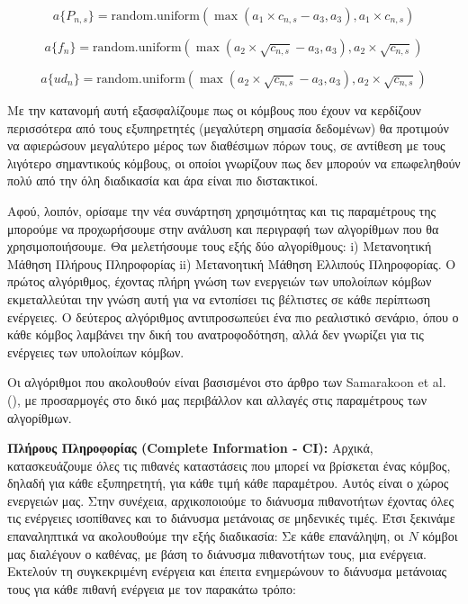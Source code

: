 \[a\{P_{n,s}\} = \text{random.uniform}\left(\max\left(a_1 \times c_{n,s} - a_3, a_3\right), a_1 \times c_{n,s}\right)\]

\[a\{f_n\} = \text{random.uniform}\left(\max\left(a_2 \times \sqrt{c_{n,s}} - a_3, a_3\right), a_2 \times \sqrt{c_{n,s}}\right)\]

\[a\{ud_n\} = \text{random.uniform}\left(\max\left(a_2 \times \sqrt{c_{n,s}} - a_3, a_3\right), a_2 \times \sqrt{c_{n,s}}\right)\]

\noindent
Με την κατανομή αυτή εξασφαλίζουμε πως οι κόμβους που έχουν να κερδίζουν περισσότερα από τους εξυπηρετητές (μεγαλύτερη σημασία δεδομένων) θα προτιμούν να αφιερώσουν μεγαλύτερο μέρος των διαθέσιμων πόρων τους, σε αντίθεση με τους λιγότερο σημαντικούς κόμβους, οι οποίοι γνωρίζουν πως δεν μπορούν να επωφεληθούν πολύ από την όλη διαδικασία και άρα είναι πιο διστακτικοί.

Αφού, λοιπόν, ορίσαμε την νέα συνάρτηση χρησιμότητας και τις παραμέτρους της μπορούμε να προχωρήσουμε στην ανάλυση και περιγραφή των αλγορίθμων που θα χρησιμοποιήσουμε. Θα μελετήσουμε τους εξής δύο αλγορίθμους: i) Μετανοητική Μάθηση Πλήρους Πληροφορίας ii) Μετανοητική Μάθηση Ελλιπούς Πληροφορίας. Ο πρώτος αλγόριθμος, έχοντας πλήρη γνώση των ενεργειών των υπολοίπων κόμβων εκμεταλλεύται την γνώση αυτή για να εντοπίσει τις βέλτιστες σε κάθε περίπτωση ενέργειες. Ο δεύτερος αλγόριθμος αντιπροσωπεύει ένα πιο ρεαλιστικό σενάριο, όπου ο κάθε κόμβος λαμβάνει την δική του ανατροφοδότηση, αλλά δεν γνωρίζει για τις ενέργειες των υπολοίπων κόμβων.

Οι αλγόριθμοι που ακολουθούν είναι βασισμένοι στο άρθρο των Samarakoon et al. (), με προσαρμογές στο δικό μας περιβάλλον και αλλαγές στις παραμέτρους των αλγορίθμων.

\textbf{Πλήρους Πληροφορίας (Complete Information - CI):} Αρχικά, κατασκευάζουμε όλες τις πιθανές καταστάσεις που μπορεί να βρίσκεται ένας κόμβος, δηλαδή για κάθε εξυπηρετητή, για κάθε τιμή κάθε παραμέτρου. Αυτός είναι ο χώρος ενεργειών μας. Στην συνέχεια, αρχικοποιούμε το διάνυσμα πιθανοτήτων έχοντας όλες τις ενέργειες ισοπίθανες και το διάνυσμα μετάνοιας σε μηδενικές τιμές. Έτσι ξεκινάμε επαναληπτικά να ακολουθούμε την εξής διαδικασία: Σε κάθε επανάληψη, οι $N$ κόμβοι μας διαλέγουν ο καθένας, με βάση το διάνυσμα πιθανοτήτων τους, μια ενέργεια. Εκτελούν τη συγκεκριμένη ενέργεια και έπειτα ενημερώνουν το διάνυσμα μετάνοιας τους για κάθε πιθανή ενέργεια με τον παρακάτω τρόπο:

\vspace{-5pt}


